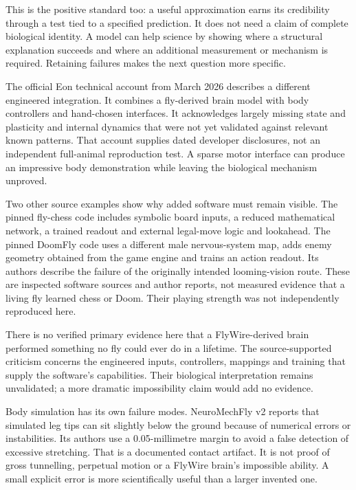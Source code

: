 This is the positive standard too: a useful approximation earns its credibility
through a test tied to a specified prediction. It does not need a claim of
complete biological identity. A model can help science by showing where a
structural explanation succeeds and where an additional measurement or mechanism
is required. Retaining failures makes the next question more specific.

The official Eon technical account from March 2026 describes a different
engineered integration. It combines a fly-derived brain model with body
controllers and hand-chosen interfaces. It acknowledges largely missing state
and plasticity and internal dynamics that were not yet validated against
relevant known patterns.\cite{eon2026} That account supplies dated developer
disclosures, not an independent full-animal reproduction test. A sparse motor
interface can produce an impressive body demonstration while leaving the
biological mechanism unproved.

Two other source examples show why added software must remain visible. The
pinned fly-chess code includes symbolic board inputs, a reduced mathematical
network, a trained readout and external legal-move logic and lookahead. The
pinned DoomFly code uses a different male nervous-system map, adds enemy
geometry obtained from the game engine and trains an action readout. Its
authors describe the failure of the originally intended looming-vision route.
These are inspected software sources and author reports, not measured evidence
that a living fly learned chess or Doom. Their playing strength was not
independently reproduced here.\cite{flychess,doomfly,doomflyMethodsPinned}

There is no verified primary evidence here that a FlyWire-derived brain
performed something no fly could ever do in a lifetime. The source-supported
criticism concerns the engineered inputs, controllers, mappings and training
that supply the software's capabilities. Their biological interpretation
remains unvalidated; a more dramatic impossibility claim would add no evidence.

Body simulation has its own failure modes. NeuroMechFly v2 reports that simulated
leg tips can sit slightly below the ground because of numerical errors or
instabilities. Its authors use a 0.05-millimetre margin to avoid a false detection
of excessive stretching.\cite{neuromechfly2024} That is a documented contact
artifact. It is not proof of gross tunnelling, perpetual motion or a FlyWire
brain's impossible ability. A small explicit error is more scientifically
useful than a larger invented one.

